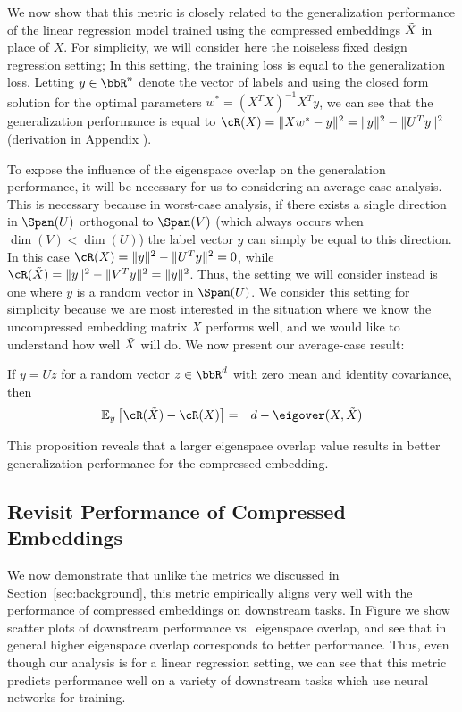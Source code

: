 We now show that this metric is closely related to the generalization performance of the linear regression model trained using the compressed embeddings $\tX$ in place of $X$.
For simplicity, we will consider here the noiseless fixed design regression setting;
In this setting, the training loss is equal to the generalization loss.
Letting $y\in\RR^n$ denote the vector of labels and using the closed form solution for the optimal parameters $w^* = (X^T X)^{-1}X^Ty$, we can see that the generalization performance is equal to $\cR(X) = \|Xw^* - y\|^2 = \|y\|^2 - \|U^T y\|^2$ (derivation in Appendix ).

To expose the influence of the eigenspace overlap on the generalation performance, it will be necessary for us to considering an average-case analysis.
This is necessary because in worst-case analysis, if there exists a single direction in $\Span(U)$ orthogonal to $\Span(V)$ (which always occurs when $\dim(V) < \dim(U)$) the label vector $y$ can simply be equal to this direction.
In this case $\cR(X) = \|y\|^2 - \|U^T y\|^2 = 0$, while $\cR(\tX) = \|y\|^2 - \|V^T y\|^2 = \|y\|^2$.
Thus, the setting we will consider instead is one where $y$ is a random vector in $\Span(U)$.
We consider this setting for simplicity because we are most interested in the situation where we know the uncompressed embedding matrix $X$ performs well, and we would like to understand how well $\tX$ will do.
We now present our average-case result:

\begin{proposition}
If $y = Uz$ for a random vector $z \in \RR^d$ with zero mean and identity covariance, then
\begin{eqnarray}
\expect{y}{\cR(\tX) - \cR(X)} &=& d - \eigover(X,\tX)
\end{eqnarray}
\end{proposition}

This proposition reveals that a larger eigenspace overlap value results in better generalization performance for the compressed embedding.

\subsection{Revisit Performance of Compressed Embeddings}
\label{subsec:revisit}
We now demonstrate that unlike the metrics we discussed in Section~\ref{sec:background}, this metric empirically aligns very well with the performance of compressed embeddings on downstream tasks.
In Figure  we show scatter plots of downstream performance vs.\ eigenspace overlap, and see that in general higher eigenspace overlap corresponds to better performance.
Thus, even though our analysis is for a linear regression setting, we can see that this metric predicts performance well on a variety of downstream tasks which use neural networks for training.

